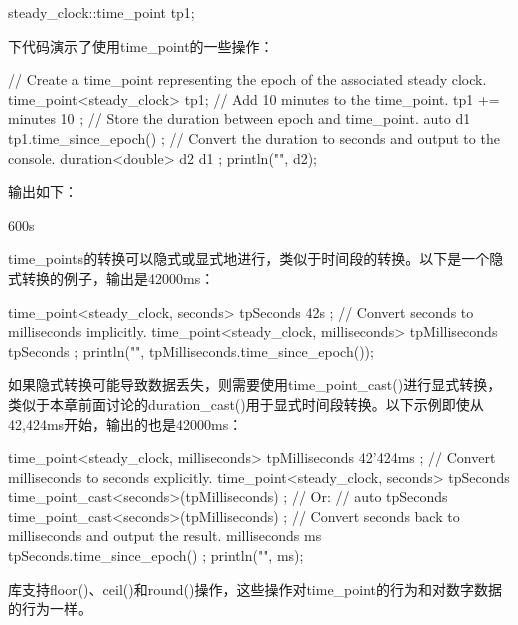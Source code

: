 \begin{cpp}
steady_clock::time_point tp1;
\end{cpp}

下代码演示了使用time\_point的一些操作：

\begin{cpp}
// Create a time_point representing the epoch of the associated steady clock.
time_point<steady_clock> tp1;
// Add 10 minutes to the time_point.
tp1 += minutes { 10 };
// Store the duration between epoch and time_point.
auto d1 { tp1.time_since_epoch() };
// Convert the duration to seconds and output to the console.
duration<double> d2 { d1 };
println("{}", d2);
\end{cpp}

输出如下：

\begin{shell}
600s
\end{shell}

time\_points的转换可以隐式或显式地进行，类似于时间段的转换。以下是一个隐式转换的例子，输出是42000ms：

\begin{cpp}
time_point<steady_clock, seconds> tpSeconds { 42s };
// Convert seconds to milliseconds implicitly.
time_point<steady_clock, milliseconds> tpMilliseconds { tpSeconds };
println("{}", tpMilliseconds.time_since_epoch());
\end{cpp}

如果隐式转换可能导致数据丢失，则需要使用time\_point\_cast()进行显式转换，类似于本章前面讨论的duration\_cast()用于显式时间段转换。以下示例即使从42,424ms开始，输出的也是42000ms：

\begin{cpp}
time_point<steady_clock, milliseconds> tpMilliseconds { 42'424ms };
// Convert milliseconds to seconds explicitly.
time_point<steady_clock, seconds> tpSeconds {
    time_point_cast<seconds>(tpMilliseconds) };
// Or:
// auto tpSeconds { time_point_cast<seconds>(tpMilliseconds) };
// Convert seconds back to milliseconds and output the result.
milliseconds ms { tpSeconds.time_since_epoch() };
println("{}", ms);
\end{cpp}

库支持floor()、ceil()和round()操作，这些操作对time\_point的行为和对数字数据的行为一样。
